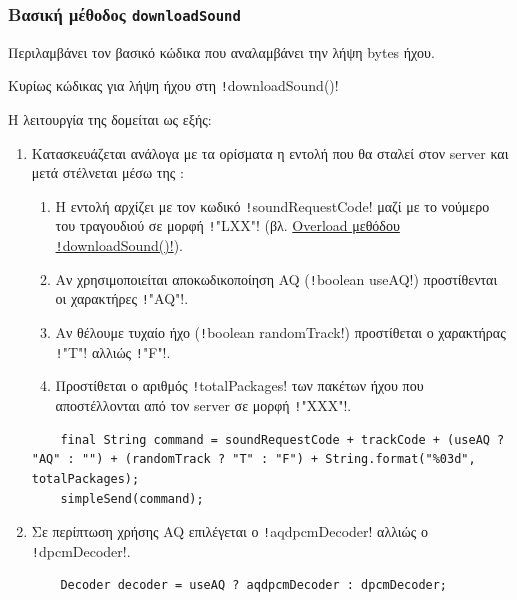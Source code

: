 \subsubsection{Βασική μέθοδος \texttt{downloadSound}}
Περιλαμβάνει τον βασικό κώδικα που αναλαμβάνει την λήψη bytes ήχου.
\begin{code}
\caption{Κυρίως κώδικας για λήψη ήχου στη \texttt!downloadSound()!}
\end{code}

Η λειτουργία της δομείται ως εξής:
\begin{enumerate}
    \item Κατασκευάζεται ανάλογα με τα ορίσματα η εντολή που θα σταλεί στον server και μετά στέλνεται μέσω της :
    \begin{enumerate}
        \item Η εντολή αρχίζει με τον κωδικό \texttt!soundRequestCode! μαζί με το νούμερο του τραγουδιού σε μορφή \texttt!"LXX"!
        (βλ. \hyperref[section:downloadSound-overload]{Overload μεθόδου \texttt!downloadSound()!}).

        \item Αν χρησιμοποιείται αποκωδικοποίηση AQ (\texttt!boolean useAQ!) προστίθενται οι χαρακτήρες \texttt!"AQ"!.

        \item Αν θέλουμε τυχαίο ήχο (\texttt!boolean randomTrack!) προστίθεται ο χαρακτήρας \texttt!"T"! αλλιώς \texttt!"F"!.

        \item Προστίθεται ο αριθμός \texttt!totalPackages! των πακέτων ήχου που αποστέλλονται από τον server σε μορφή \texttt!"XXX"!.
    \end{enumerate}
    \begin{verbatim}
    final String command = soundRequestCode + trackCode + (useAQ ? "AQ" : "") + (randomTrack ? "T" : "F") + String.format("%03d", totalPackages);
    simpleSend(command);
    \end{verbatim}

    \item Σε περίπτωση χρήσης AQ επιλέγεται ο \texttt!aqdpcmDecoder! αλλιώς ο \texttt!dpcmDecoder!.
    \begin{verbatim}
    Decoder decoder = useAQ ? aqdpcmDecoder : dpcmDecoder;
    \end{verbatim}


\end{enumerate}
